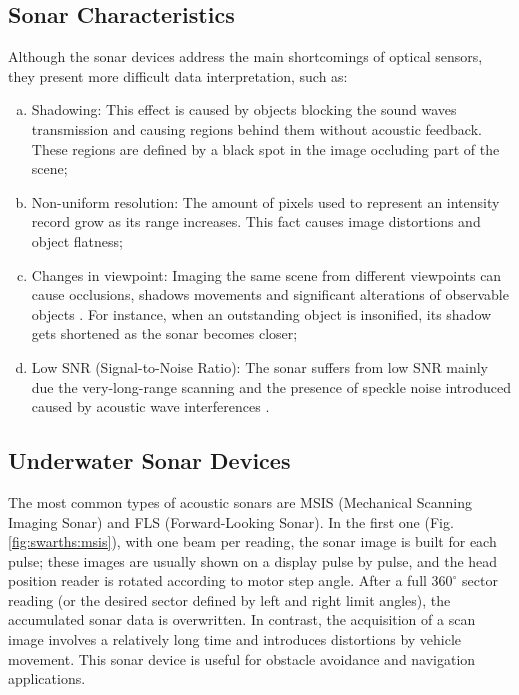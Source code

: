 \documentclass[final,5p,times]{elsarticle}
\begin{document}

\subsection{Sonar Characteristics}
\label{sonar:characteristics}

Although the sonar devices address the main shortcomings of optical sensors, they present more difficult data interpretation, such as:

\begin{enumerate}[(a)]
    \item Shadowing: This effect is caused by objects blocking the sound waves transmission and causing regions behind them without acoustic feedback. These regions are defined by a black spot in the image occluding part of the scene;
    \item Non-uniform resolution: The amount of pixels used to represent an intensity record grow as its range increases. This fact causes image distortions and object flatness;
    \item Changes in viewpoint: Imaging the same scene from different viewpoints can cause occlusions, shadows movements and significant alterations of observable objects \cite{hurtos2014}. For instance, when an outstanding object is insonified, its shadow gets shortened as the sonar becomes closer;
    \item Low SNR (Signal-to-Noise Ratio): The sonar suffers from low SNR mainly due the very-long-range scanning and the presence of speckle noise introduced caused by acoustic wave interferences \cite{abbott1973}.
\end{enumerate}


\subsection{Underwater Sonar Devices}
\label{sonar:devices}

The most common types of acoustic sonars are MSIS (Mechanical Scanning Imaging Sonar) and FLS (Forward-Looking Sonar). In the first one (Fig. \ref{fig:swarths:msis}), with one beam per reading, the sonar image is built for each pulse; these images are usually shown on a display pulse by pulse, and the head position reader is rotated according to motor step angle. After a full $360^{\circ}$ sector reading (or the desired sector defined by left and right limit angles), the accumulated sonar data is overwritten. In contrast, the acquisition of a scan image involves a relatively long time and introduces distortions by vehicle movement. This sonar device is useful for obstacle avoidance \cite{ganesan2015} and navigation \cite{ribas2010} applications.
\end{document}
